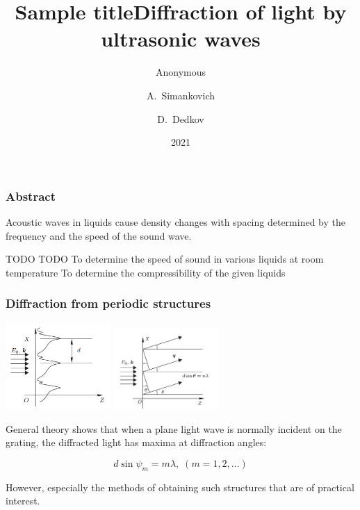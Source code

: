 \documentclass{beamer}
\title{Sample title}
\author{Anonymous}
\institute{Overleaf}
\date{2021}
\title[About Beamer] %
{Diffraction of light by ultrasonic waves}
\author[Arthur, Doe] %
{A.~Simankovich \and D.~Dedkov }
\institute[VFU] %
{
	Moscow Institute of Physics and Technology
}
\date[VLC 2023] %
\begin{document}
	
	\frame{\titlepage}
	
	\begin{frame}
		\frametitle{Abstract}
		Acoustic waves in liquids cause density changes with spacing determined by the
		frequency and the speed of the sound wave.
		
			
		TODO TODO
		To determine the speed of sound in various liquids at room temperature
		To determine the compressibility of the given liquids

	\end{frame}
	
	
	
	

	
	
	\begin{frame}
		\frametitle{Diffraction from periodic structures}
		\includegraphics[width=4cm]{res/periodic.png}
		\includegraphics[width=4cm]{res/diffraction_general.png}
		
		
		General theory shows that when a plane light wave is normally incident on the grating, the diffracted light has maxima at diffraction angles:

		$$d \sin{\psi_m} = m \lambda,\; (m = 1, 2, ...)$$
		
		
		However, especially the methods of obtaining such structures that are of practical interest.
	\end{frame}
\end{document}
